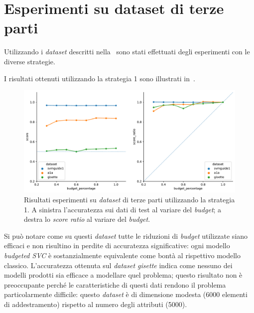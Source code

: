 \section{Esperimenti su dataset di terze parti}\label{sec:exp:real_ds}
Utilizzando i \emph{dataset} descritti nella~ sono stati effettuati degli esperimenti con le diverse strategie.

I risultati ottenuti utilizzando la strategia 1 sono illustrati in~.
\begin{figure}
    \centering
    \includegraphics[width=1\linewidth]{img//TP/tp_old_strategy.pdf}
    \caption[Risultati degli esperimenti su \emph{dataset} di terze parti utilizzando la strategia 1.]{Risultati esperimenti su \emph{dataset} di terze parti utilizzando la strategia 1. A sinistra l'accuratezza sui dati di test al variare del \emph{budget}; a destra lo \emph{score ratio} al variare del \emph{budget}.}
    \label{fig:TP_old_strategy}
\end{figure}
Si può notare come su questi \emph{dataset} tutte le riduzioni di \emph{budget} utilizzate siano efficaci e non risultino in perdite di accuratezza significative: ogni modello \emph{budgeted SVC} è sostanzialmente equivalente come bontà al rispettivo modello classico.
L'accuratezza ottenuta sul \emph{dataset gisette} indica come nessuno dei modelli prodotti sia efficace a modellare quel problema; questo risultato non è preoccupante perché le caratteristiche di questi dati rendono il problema particolarmente difficile: questo \emph{dataset} è di dimensione modesta (6000 elementi di addestramento) rispetto al numero degli attributi (5000).

